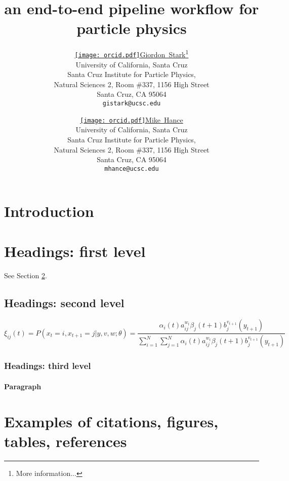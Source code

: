 \documentclass{article}
\title{an end-to-end pipeline workflow for particle physics}
\author{ \href{https://orcid.org/0000-0001-6616-3433}{\texttt{[image: orcid.pdf]}\hspace{1mm}Giordon~Stark}\thanks{More information...} \\
  University of California, Santa Cruz \\
  Santa Cruz Institute for Particle Physics, \\
  Natural Sciences 2, Room \#337, 1156 High Street \\
  Santa Cruz, CA 95064 \\
	\texttt{gistark@ucsc.edu} \\
	\and
	\href{https://orcid.org/0000-0001-8392-0934}{\texttt{[image: orcid.pdf]}\hspace{1mm}Mike~Hance} \\
  University of California, Santa Cruz \\
  Santa Cruz Institute for Particle Physics, \\
  Natural Sciences 2, Room \#337, 1156 High Street \\
  Santa Cruz, CA 95064 \\
	\texttt{mhance@ucsc.edu} \\
}
\begin{document}
\maketitle

\begin{abstract}
	\lipsum[1]
\end{abstract}




\section{Introduction}
\label{sec:introduction}
\lipsum[2]
\lipsum[3]


\section{Headings: first level}
\label{sec:headings-first-level}

\lipsum[4] See Section \ref{sec:headings-first-level}.

\subsection{Headings: second level}
\label{ssec:headings-second-level}
\lipsum[5]
\begin{equation}
	\xi_{ij}(t)=P(x_{t}=i,x_{t+1}=j|y,v,w;\theta)= {\frac {\alpha_{i}(t)a^{w_t}_{ij}\beta_{j}(t+1)b^{v_{t+1}}_{j}(y_{t+1})}{\sum_{i=1}^{N} \sum_{j=1}^{N} \alpha_{i}(t)a^{w_t}_{ij}\beta_{j}(t+1)b^{v_{t+1}}_{j}(y_{t+1})}}
\end{equation}

\subsubsection{Headings: third level}
\label{sssec:headings-third-level}
\lipsum[6]

\paragraph{Paragraph}
\lipsum[7]



\section{Examples of citations, figures, tables, references}
\label{sec:examples-of-citations-figures-tables-references}
\end{document}

